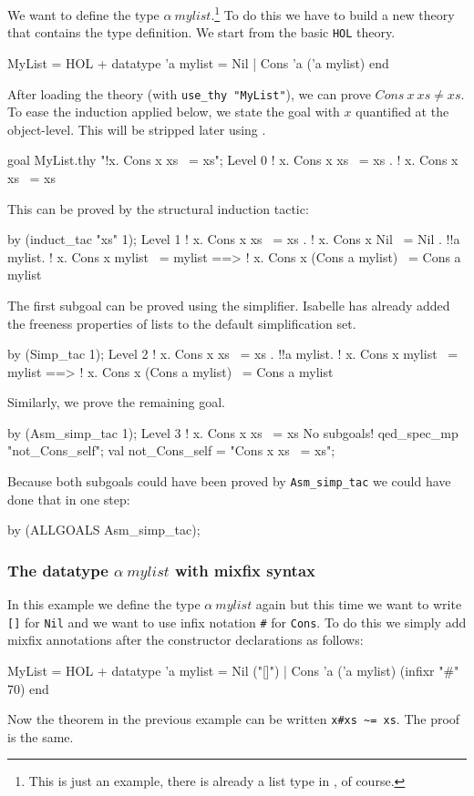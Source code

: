 We want to define the type $\alpha~mylist$.\footnote{This is just an
  example, there is already a list type in \HOL, of course.} To do
this we have to build a new theory that contains the type definition.
We start from the basic \texttt{HOL} theory.
\begin{ttbox}
MyList = HOL +
  datatype 'a mylist = Nil | Cons 'a ('a mylist)
end
\end{ttbox}
After loading the theory (with \verb$use_thy "MyList"$), we can prove
$Cons~x~xs\neq xs$.  To ease the induction applied below, we state the
goal with $x$ quantified at the object-level.  This will be stripped
later using .
\begin{ttbox}
goal MyList.thy "!x. Cons x xs ~= xs";
{\out Level 0}
{\out ! x. Cons x xs ~= xs}
{. ! x. Cons x xs ~= xs}
\end{ttbox}
This can be proved by the structural induction tactic:
\begin{ttbox}
by (induct_tac "xs" 1);
{\out Level 1}
{\out ! x. Cons x xs ~= xs}
{. ! x. Cons x Nil ~= Nil}
{. !!a mylist.}
{\out        ! x. Cons x mylist ~= mylist ==>}
{\out        ! x. Cons x (Cons a mylist) ~= Cons a mylist}
\end{ttbox}
The first subgoal can be proved using the simplifier.
Isabelle has already added the freeness properties of lists to the 
default simplification set.
\begin{ttbox}
by (Simp_tac 1);
{\out Level 2}
{\out ! x. Cons x xs ~= xs}
{. !!a mylist.}
{\out        ! x. Cons x mylist ~= mylist ==>}
{\out        ! x. Cons x (Cons a mylist) ~= Cons a mylist}
\end{ttbox}
Similarly, we prove the remaining goal.
\begin{ttbox}
by (Asm_simp_tac 1);
{\out Level 3}
{\out ! x. Cons x xs ~= xs}
{\out No subgoals!}
\ttbreak
qed_spec_mp "not_Cons_self";
{\out val not_Cons_self = "Cons x xs ~= xs";}
\end{ttbox}
Because both subgoals could have been proved by \texttt{Asm_simp_tac}
we could have done that in one step:
\begin{ttbox}
by (ALLGOALS Asm_simp_tac);
\end{ttbox}


\subsubsection{The datatype $\alpha~mylist$ with mixfix syntax}

In this example we define the type $\alpha~mylist$ again but this time
we want to write \texttt{[]} for \texttt{Nil} and we want to use infix
notation \verb|#| for \texttt{Cons}.  To do this we simply add mixfix
annotations after the constructor declarations as follows:
\begin{ttbox}
MyList = HOL +
  datatype 'a mylist =
    Nil ("[]")  |
    Cons 'a ('a mylist)  (infixr "#" 70)
end
\end{ttbox}
Now the theorem in the previous example can be written \verb|x#xs ~= xs|.  The
proof is the same.


